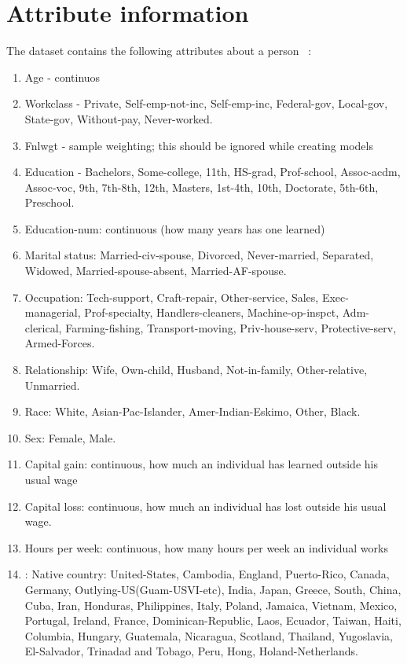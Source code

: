 \section{Attribute information}
The dataset contains the following attributes about a person ~\cite{uci-link}:
\begin{enumerate}
    \item Age - continuos
    \item Workclass - Private, Self-emp-not-inc, Self-emp-inc, Federal-gov, Local-gov, State-gov, Without-pay, Never-worked.
    \item Fnlwgt - sample weighting; this should be ignored while creating models
    \item Education - Bachelors, Some-college, 11th, HS-grad, Prof-school, Assoc-acdm, Assoc-voc, 9th, 7th-8th, 12th, Masters, 1st-4th, 10th, Doctorate, 5th-6th, Preschool. 
    \item Education-num: continuous (how many years has one learned)
    \item Marital status: Married-civ-spouse, Divorced, Never-married, Separated, Widowed, Married-spouse-absent, Married-AF-spouse. 
    \item Occupation: Tech-support, Craft-repair, Other-service, Sales, Exec-managerial, Prof-specialty, Handlers-cleaners, Machine-op-inspct, Adm-clerical, Farming-fishing, Transport-moving, Priv-house-serv, Protective-serv, Armed-Forces.
    \item Relationship: Wife, Own-child, Husband, Not-in-family, Other-relative, Unmarried. 
    \item Race: White, Asian-Pac-Islander, Amer-Indian-Eskimo, Other, Black. 
    \item Sex: Female, Male. 
    \item Capital gain: continuous, how much an individual has learned outside his usual wage
    \item Capital loss: continuous, how much an individual has lost outside his usual wage.
    \item Hours per week: continuous, how many hours per week an individual works
    \item: Native country: United-States, Cambodia, England, Puerto-Rico, Canada, Germany, Outlying-US(Guam-USVI-etc), India, Japan, Greece, South, China, Cuba, Iran, Honduras, Philippines, Italy, Poland, Jamaica, Vietnam, Mexico, Portugal, Ireland, France, Dominican-Republic, Laos, Ecuador, Taiwan, Haiti, Columbia, Hungary, Guatemala, Nicaragua, Scotland, Thailand, Yugoslavia, El-Salvador, Trinadad and Tobago, Peru, Hong, Holand-Netherlands.
\end{enumerate}
